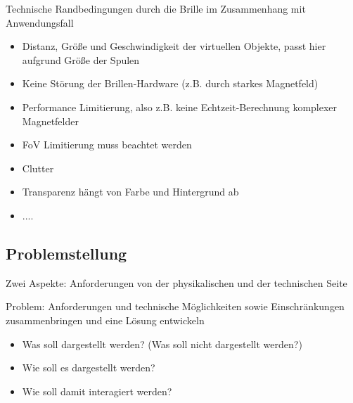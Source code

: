 Technische Randbedingungen durch die Brille im Zusammenhang mit Anwendungsfall
\begin{itemize}
	\item Distanz, Größe und Geschwindigkeit der virtuellen Objekte, passt hier aufgrund Größe der Spulen
	\item Keine Störung der Brillen-Hardware (z.B. durch starkes Magnetfeld)
	\item Performance Limitierung, also z.B. keine Echtzeit-Berechnung komplexer Magnetfelder
	\item FoV Limitierung muss beachtet werden
	\item Clutter
	\item Transparenz hängt von Farbe und Hintergrund ab
	\item ....
\end{itemize}

\subsection{Problemstellung}
\label{sec-3-2}
Zwei Aspekte: Anforderungen von der physikalischen und der technischen Seite

Problem: Anforderungen und technische Möglichkeiten sowie Einschränkungen zusammenbringen und eine Lösung entwickeln
\begin{itemize}
	\item Was soll dargestellt werden? (Was soll nicht dargestellt werden?)
	\item Wie soll es dargestellt werden?
	\item Wie soll damit interagiert werden?
\end{itemize}

